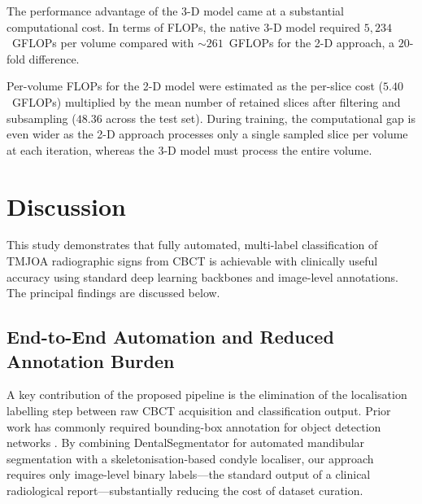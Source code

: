 \documentclass[review,12pt]{elsarticle}
\begin{document}
The performance advantage of the 3-D model came at a substantial
computational cost. In terms of FLOPs, the native 3-D model required
$5{,}234$~GFLOPs per volume compared with ${\sim}261$~GFLOPs for the
2-D approach, a $20$-fold difference. 

Per-volume FLOPs for the 2-D
model were estimated as the per-slice cost ($5.40$~GFLOPs) multiplied
by the mean number of retained slices after filtering and subsampling
($48.36$ across the test set). During training, the
computational gap is even wider as the 2-D approach processes only a
single sampled slice per volume at each iteration, whereas the 3-D
model must process the entire volume.

\section{Discussion}
\label{sec:discussion}

This study demonstrates that fully automated, multi-label classification
of TMJOA radiographic signs from CBCT is achievable with clinically
useful accuracy using standard deep learning backbones and image-level
annotations. The principal findings are discussed below.

\subsection{End-to-End Automation and Reduced Annotation Burden}

A key contribution of the proposed pipeline is the elimination of the
localisation labelling step between raw CBCT acquisition and
classification output. Prior work has commonly required bounding-box
annotation for object detection networks
\cite{talaat2023artificial,lee2020automated,Mao2025,ecser2023classification,choi2025artificial}.
By combining DentalSegmentator \cite{dot2024dentalsegmentator} for
automated mandibular segmentation with a skeletonisation-based condyle
localiser, our approach requires only image-level binary labels---the
standard output of a clinical radiological report---substantially
reducing the cost of dataset curation.
\end{document}
